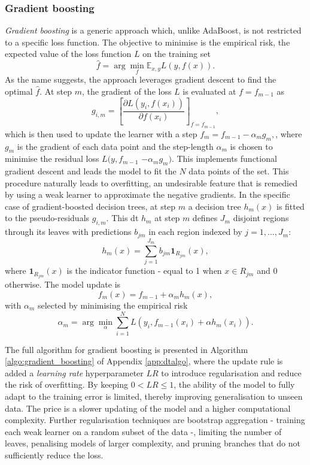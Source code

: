 \subsubsection{Gradient boosting}\label{sec-gradient-boost}
\textit{Gradient boosting} is a generic approach which, unlike AdaBoost, is not restricted to a specific loss function. The objective to minimise is the empirical risk, the expected value of the loss function $L$ on the training set 
\begin{equation}\label{eq:empRisk}
    \hat{f}  = \arg \min_f \mathbb{E}_{x,y} L(y, f(x)).
\end{equation}
As the name suggests, the approach leverages gradient descent to find the optimal $\hat{f}$. At step $m$, the gradient of the loss $L$ is evaluated at $f = f_{m-1}$ as \[ g_{i,m} = \left[ \frac{\partial  L(y_i, f(x_i))}{\partial f(x_i)} \right]_{f= f_{m-1}}, \] which is then used to update the learner with a step $f_m = f_{m-1} - \alpha_m g_{m},$, where $g_m$ is the gradient of each data point and the step-length $\alpha_m$ is chosen to minimise the residual loss $L(y, f_{m-1}$ $- \alpha_m g_{m})$. This implements functional gradient descent and leads the model to fit the $N$ data points of the set. This procedure naturally leads to overfitting, an undesirable feature that is remedied by using a weak learner to approximate the negative gradients. In the specific case of gradient-boosted decision trees, at step $m$ a decision tree $h_m(x)$ is fitted to the pseudo-residuals $g_{i,m}$. This \gls{dt} $h_m$ at step $m$ defines $J_m$ disjoint regions through its leaves with predictions $b_{jm}$ in each region indexed by $j = 1, ..., J_m$: \[ h_m(x) = \sum_{j=1}^{J_m} b_{jm} \textbf{1}_{R_{jm}}(x),\] where $\textbf{1}_{R_{jm}}(x)$ is the indicator function - equal to 1 when $x \in R_{jm}$ and 0 otherwise. The model update is \[f_m(x) = f_{m-1} + \alpha_m h_m(x),\] with $\alpha_m$ selected by minimising the empirical risk \[ \alpha_m = \arg \min_{\alpha} \sum_{i=1}^N L\left(y_i, f_{m-1}(x_i) + \alpha h_m(x_i)\right).\]

The full algorithm for gradient boosting is presented in Algorithm \ref{algo:gradient_boosting} of Appendix \ref{app:dtalgo}, where the update rule is added a \textit{learning rate} hyperparameter $LR$ to introduce regularisation and reduce the risk of overfitting. By keeping $0 < LR \leq 1$, the ability of the model to fully adapt to the training error is limited, thereby improving generalisation to unseen data. The price is a slower updating of the model and a higher computational complexity. Further regularisation techniques are bootstrap aggregation - training each weak learner on a random subset of the data -, limiting the number of leaves, penalising models of larger complexity, and pruning branches that do not sufficiently reduce the loss. \\

